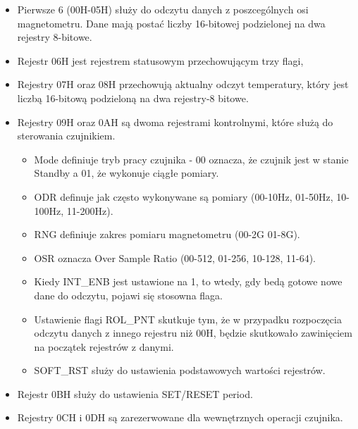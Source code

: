 \documentclass[11pt, a4paper]{article}
\begin{document}
\begin{itemize}
\item Pierwsze 6 (00H-05H) służy do odczytu danych z poszcególnych osi magnetometru. Dane mają postać liczby 16-bitowej podzielonej na dwa rejestry 8-bitowe.
\item Rejestr 06H jest rejestrem statusowym przechowującym trzy flagi,
\item Rejestry 07H oraz 08H przechowują aktualny odczyt temperatury, który jest liczbą 16-bitową podzieloną na dwa rejestry-8 bitowe.
\item Rejestry 09H oraz 0AH są dwoma rejestrami kontrolnymi, które służą do sterowania czujnikiem.
\begin{itemize}
    \item Mode definiuje tryb pracy czujnika - 00 oznacza, że czujnik jest w stanie Standby a 01, że wykonuje ciągłe pomiary.
    \item ODR definuje jak często wykonywane są pomiary (00-10Hz, 01-50Hz, 10-100Hz, 11-200Hz).\\
    \item RNG definiuje zakres pomiaru magnetometru (00-2G 01-8G).\\
    \item OSR oznacza Over Sample Ratio (00-512, 01-256, 10-128, 11-64).\\
    \item Kiedy INT\_ENB jest ustawione na 1, to wtedy, gdy bedą gotowe nowe dane do odczytu, pojawi się stosowna flaga.\\
    \item Ustawienie flagi ROL\_PNT skutkuje tym, że w przypadku rozpoczęcia odczytu danych z innego rejestru niż 00H, będzie skutkowało zawinięciem na początek rejestrów z danymi.\\
    \item SOFT\_RST służy do ustawienia podstawowych wartości rejestrów.\\
\end{itemize}
\item Rejestr 0BH służy do ustawienia SET/RESET period.
\item Rejestry 0CH i 0DH są zarezerwowane dla wewnętrznych operacji czujnika.
\end{itemize}
\vspace{0.5cm}
\end{document}
